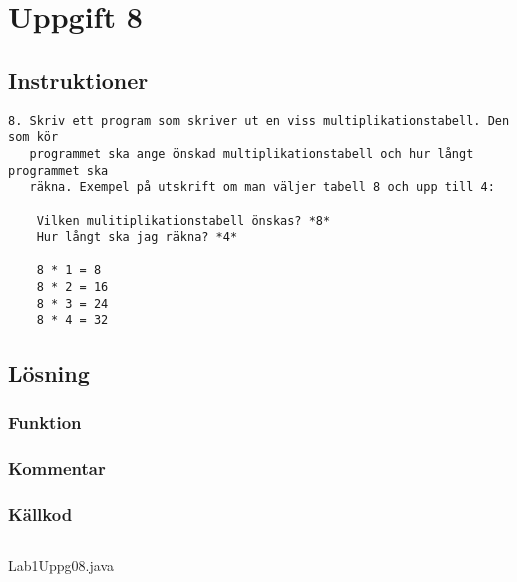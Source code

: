 \section{Uppgift 8}\label{uppgift-8}

\subsection{Instruktioner}
\begin{verbatim}
8. Skriv ett program som skriver ut en viss multiplikationstabell. Den som kör
   programmet ska ange önskad multiplikationstabell och hur långt programmet ska
   räkna. Exempel på utskrift om man väljer tabell 8 och upp till 4:

    Vilken mulitiplikationstabell önskas? *8*
    Hur långt ska jag räkna? *4*

    8 * 1 = 8
    8 * 2 = 16
    8 * 3 = 24
    8 * 4 = 32
\end{verbatim}

\subsection{Lösning}
\subsubsection{Funktion}
\subsubsection{Kommentar}

\subsubsection{Källkod}\label{uppgift-8_src}
    \inputminted[linenos]{java}{src/Lab1Uppg08.java}
    \caption{Lab1Uppg08.java}
    \label{Uppg8src}
